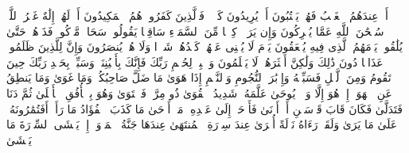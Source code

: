 \stopbuffer
\startbuffer[\q:52:41]
أَمۡ عِندَهُمُ ٱلۡغَیۡبُ فَهُمۡ یَكۡتُبُونَ%
\stopbuffer
\startbuffer[\q:52:42]
أَمۡ یُرِیدُونَ كَیۡدࣰاۖ فَٱلَّذِینَ كَفَرُوا۟ هُمُ ٱلۡمَكِیدُونَ%
\stopbuffer
\startbuffer[\q:52:43]
أَمۡ لَهُمۡ إِلَٰهٌ غَیۡرُ ٱللَّهِۚ سُبۡحَٰنَ ٱللَّهِ عَمَّا یُشۡرِكُونَ%
\stopbuffer
\startbuffer[\q:52:44]
وَإِن یَرَوۡا۟ كِسۡفࣰا مِّنَ ٱلسَّمَاۤءِ سَاقِطࣰا یَقُولُوا۟ سَحَابࣱ مَّرۡكُومࣱ%
\stopbuffer
\startbuffer[\q:52:45]
فَذَرۡهُمۡ حَتَّىٰ یُلَٰقُوا۟ یَوۡمَهُمُ ٱلَّذِی فِیهِ یُصۡعَقُونَ%
\stopbuffer
\startbuffer[\q:52:46]
یَوۡمَ لَا یُغۡنِی عَنۡهُمۡ كَیۡدُهُمۡ شَیۡءࣰا وَلَا هُمۡ یُنصَرُونَ%
\stopbuffer
\startbuffer[\q:52:47]
وَإِنَّ لِلَّذِینَ ظَلَمُوا۟ عَذَابࣰا دُونَ ذَٰلِكَ وَلَٰكِنَّ أَكۡثَرَهُمۡ لَا یَعۡلَمُونَ%
\stopbuffer
\startbuffer[\q:52:48]
وَٱصۡبِرۡ لِحُكۡمِ رَبِّكَ فَإِنَّكَ بِأَعۡیُنِنَاۖ وَسَبِّحۡ بِحَمۡدِ رَبِّكَ حِینَ تَقُومُ%
\stopbuffer
\startbuffer[\q:52:49]
وَمِنَ ٱلَّیۡلِ فَسَبِّحۡهُ وَإِدۡبَٰرَ ٱلنُّجُومِ%
\stopbuffer
\startbuffer[\q:53:1]
وَٱلنَّجۡمِ إِذَا هَوَىٰ%
\stopbuffer
\startbuffer[\q:53:2]
مَا ضَلَّ صَاحِبُكُمۡ وَمَا غَوَىٰ%
\stopbuffer
\startbuffer[\q:53:3]
وَمَا یَنطِقُ عَنِ ٱلۡهَوَىٰۤ%
\stopbuffer
\startbuffer[\q:53:4]
إِنۡ هُوَ إِلَّا وَحۡیࣱ یُوحَىٰ%
\stopbuffer
\startbuffer[\q:53:5]
عَلَّمَهُۥ شَدِیدُ ٱلۡقُوَىٰ%
\stopbuffer
\startbuffer[\q:53:6]
ذُو مِرَّةࣲ فَٱسۡتَوَىٰ%
\stopbuffer
\startbuffer[\q:53:7]
وَهُوَ بِٱلۡأُفُقِ ٱلۡأَعۡلَىٰ%
\stopbuffer
\startbuffer[\q:53:8]
ثُمَّ دَنَا فَتَدَلَّىٰ%
\stopbuffer
\startbuffer[\q:53:9]
فَكَانَ قَابَ قَوۡسَیۡنِ أَوۡ أَدۡنَىٰ%
\stopbuffer
\startbuffer[\q:53:10]
فَأَوۡحَىٰۤ إِلَىٰ عَبۡدِهِۦ مَاۤ أَوۡحَىٰ%
\stopbuffer
\startbuffer[\q:53:11]
مَا كَذَبَ ٱلۡفُؤَادُ مَا رَأَىٰۤ%
\stopbuffer
\startbuffer[\q:53:12]
أَفَتُمَٰرُونَهُۥ عَلَىٰ مَا یَرَىٰ%
\stopbuffer
\startbuffer[\q:53:13]
وَلَقَدۡ رَءَاهُ نَزۡلَةً أُخۡرَىٰ%
\stopbuffer
\startbuffer[\q:53:14]
عِندَ سِدۡرَةِ ٱلۡمُنتَهَىٰ%
\stopbuffer
\startbuffer[\q:53:15]
عِندَهَا جَنَّةُ ٱلۡمَأۡوَىٰۤ%
\stopbuffer
\startbuffer[\q:53:16]
إِذۡ یَغۡشَى ٱلسِّدۡرَةَ مَا یَغۡشَىٰ%
\stopbuffer
